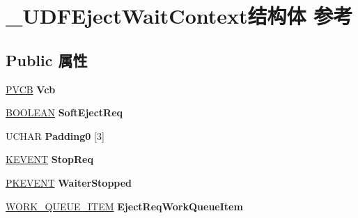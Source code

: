 \hypertarget{struct___u_d_f_eject_wait_context}{}\section{\+\_\+\+U\+D\+F\+Eject\+Wait\+Context结构体 参考}
\label{struct___u_d_f_eject_wait_context}
\subsection*{Public 属性}
\begin{DoxyCompactItemize}
\item 
\mbox{\label{struct___u_d_f_eject_wait_context_a38d2802c8a56e6531f34c71374df23bd}} 
\hyperlink{struct_d_e_v_i_c_e___e_x_t_e_n_s_i_o_n}{P\+V\+CB} {\bfseries Vcb}
\item 
\mbox{\label{struct___u_d_f_eject_wait_context_a54cbf067e7887c5d0bb641c15f875423}} 
\hyperlink{_processor_bind_8h_a112e3146cb38b6ee95e64d85842e380a}{B\+O\+O\+L\+E\+AN} {\bfseries Soft\+Eject\+Req}
\item 
\mbox{\label{struct___u_d_f_eject_wait_context_ab943c994381bd939a4c2a9eff8cb0d90}} 
U\+C\+H\+AR {\bfseries Padding0} \mbox{[}3\mbox{]}
\item 
\mbox{\label{struct___u_d_f_eject_wait_context_a3b5fe86c21c3f357951b3a64a389cb67}} 
\hyperlink{struct___k_e_v_e_n_t}{K\+E\+V\+E\+NT} {\bfseries Stop\+Req}
\item 
\mbox{\label{struct___u_d_f_eject_wait_context_aadc9c5f0599312d846b3da4b551c994b}} 
\hyperlink{struct___k_e_v_e_n_t}{P\+K\+E\+V\+E\+NT} {\bfseries Waiter\+Stopped}
\item 
\mbox{\label{struct___u_d_f_eject_wait_context_a02b9777f6521c7b56f1d2eef5463b347}} 
\hyperlink{struct___w_o_r_k___q_u_e_u_e___i_t_e_m}{W\+O\+R\+K\+\_\+\+Q\+U\+E\+U\+E\+\_\+\+I\+T\+EM} {\bfseries Eject\+Req\+Work\+Queue\+Item}
\item 
\mbox{\label{struct___u_d_f_eject_wait_context_a789a9a6be1cc062277c7b7e05640a018}} 

\end{DoxyCompactItemize}
